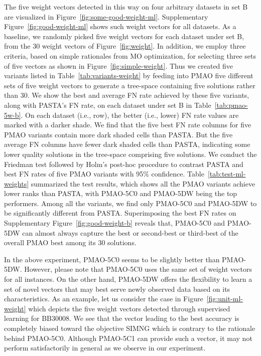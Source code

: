 \documentclass[a4paper,fleqn, review]{cas-dc}
\begin{document}
The five weight vectors detected in this way on four arbitrary datasets in set B are visualized in Figure~\ref{fig:some-good-weight-ml}. Supplementary Figure~\ref{fig:good-weight-ml} shows such weight vectors for all datasets. As a baseline, we randomly picked five weight vectors for each dataset under set B, from the 30 weight vectors of Figure~\ref{fig:weight}. In addition, we employ three criteria, based on simple rationales from MO optimization, for selecting three sets of five vectors as shown in Figure~\ref{fig:simple-weight}.
Thus we created five variants listed in Table~\ref{tab:variants-weight} by feeding into PMAO five different sets of five weight vectors to generate a tree-space containing five solutions rather than 30. We show the best and average FN rate achieved by these five variants, along with PASTA's FN rate, on each dataset under set B in Table~\ref{tab:pmao-5w-b}. On each dataset (i.e., row), the better (i.e., lower) FN rate values are marked with a darker shade. We find that the five best FN rate columns for five PMAO variants contain more dark shaded cells than PASTA. But the five average FN columns have fewer dark shaded cells than PASTA, indicating some lower quality solutions in the tree-space comprising five solutions. We conduct the Friedman test followed by Holm's post-hoc procedure to contrast PASTA and best FN rates of five PMAO variants with 95\% confidence. Table~\ref{tab:test-ml-weights} summarized the test results, which shows all the PMAO variants achieve lower ranks than PASTA, with PMAO-5C0 and PMAO-5DW being the top performers. Among all the variants, we find only PMAO-5C0 and PMAO-5DW to be significantly different from PASTA. Superimposing the best FN rates on Supplementary Figure~\ref{fig:good-weight-b} reveals that, PMAO-5C0 and PMAO-5DW can almost always capture the best or second-best or third-best of the overall PMAO best among its 30 solutions. 

In the above experiment, PMAO-5C0 seems to be slightly better than PMAO-5DW. However, please note that PMAO-5C0 uses the same set of weight vectors for all instances. On the other hand, PMAO-5DW offers the flexibility to learn a set of novel vectors that may best serve newly observed data based on its characteristics. As an example, let us consider the case in Figure~\ref{fig:unit-ml-weight} which depicts the five weight vectors detected through supervised learning for BB30008. We see that the vector leading to the best accuracy is completely biased toward the objective SIMNG which is contrary to the rationale behind PMAO-5C0. Although PMAO-5C1 can provide such a vector, it may not perform satisfactorily in general as we observe in our experiment.
\end{document}
